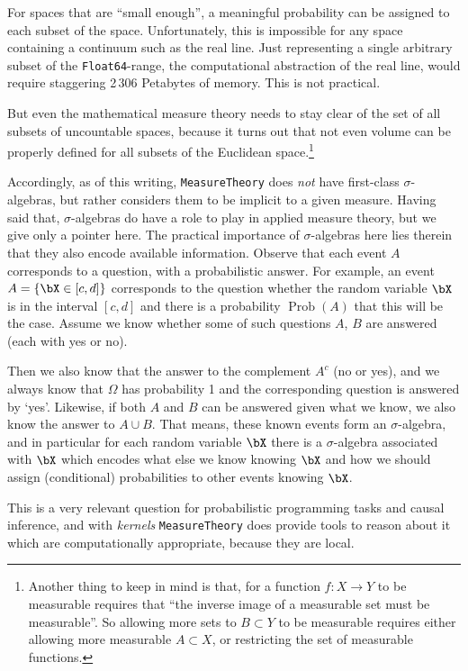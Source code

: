 \documentclass{juliacon}
\begin{document}
For spaces that are ``small enough'', a meaningful probability can be assigned to each subset of the space. Unfortunately, this is impossible for any space containing a continuum such as the real line. Just representing a single arbitrary subset of the \verb|Float64|-range, the computational abstraction of the real line, would require staggering 2\,306 Petabytes of memory. This is not practical.

But even the mathematical measure theory needs to stay clear of the set of all subsets of uncountable spaces, because it turns out that not even volume can be properly defined for all subsets of the Euclidean space.\footnote{Another thing to keep in mind is that, for a function $f\colon X \to Y$ to be measurable requires that ``the inverse image of a measurable set must be measurable''. So allowing more sets to $B\subset Y$ to be measurable requires either allowing more measurable $A\subset X$, or restricting the set of measurable functions.}


Accordingly, as of this writing, \verb|MeasureTheory| does \emph{not} have first-class $\sigma$-algebras, but rather considers them to be implicit to a given measure. 
Having said that, $\sigma$-algebras do have a role to play in applied measure theory, but we give only a pointer here. 
The practical importance of $\sigma$-algebras here lies therein that they also encode available information. Observe that each event $A$ corresponds to a question, with a probabilistic answer. 
 For example, an event $A = \{\bX \in  [c, d]\}$ corresponds to the question whether the random variable $\bX$ is in the interval $[c, d]$ and there is a probability $\operatorname{Prob}(A)$ that this will be the case. 
 Assume we know whether some of such questions $A$, $B$ are answered (each with yes or no).
 
 Then we also know that the answer to the complement $A^c$ (no or yes), and we always know that $\Omega$ has probability 1 and the corresponding question is answered by `yes'. Likewise, if both $A$ and $B$ can be answered given what we know, we also know the answer to $A \cup B$. That means, these known events form an $\sigma$-algebra, and in particular for each random variable $\bX$ there is a $\sigma$-algebra associated with $\bX$ which encodes what else we know knowing $\bX$ and how we should assign (conditional) probabilities to other events knowing $\bX$.
 
 This is a very relevant question for probabilistic programming tasks and causal inference, and with \emph{kernels} \verb|MeasureTheory| does provide tools to reason about it which are computationally appropriate, because they are local.
 
\end{document}
